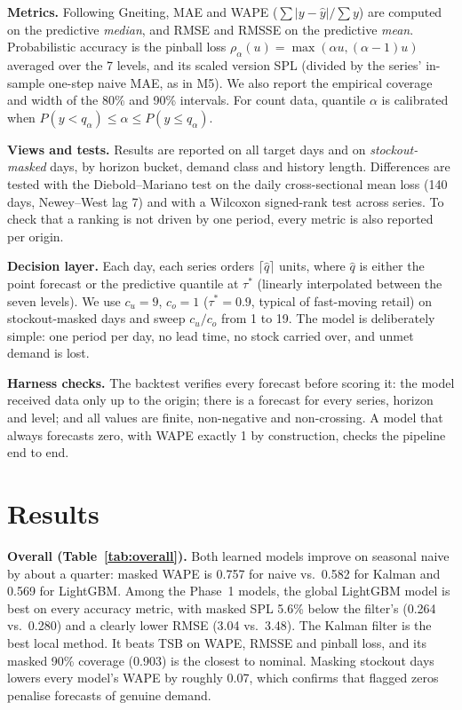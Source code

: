 \documentclass[conference]{IEEEtran}
\begin{document}
\textbf{Metrics.} Following Gneiting, MAE and WAPE ($\sum|y-\hat y|/\sum y$) are computed on the predictive \emph{median}, and RMSE and RMSSE on the predictive \emph{mean}. Probabilistic accuracy is the pinball loss $\rho_\alpha(u)=\max(\alpha u,(\alpha-1)u)$ averaged over the 7 levels, and its scaled version SPL (divided by the series' in-sample one-step naive MAE, as in M5). We also report the empirical coverage and width of the 80\% and 90\% intervals. For count data, quantile $\alpha$ is calibrated when $P(y<q_\alpha)\le\alpha\le P(y\le q_\alpha)$.

\textbf{Views and tests.} Results are reported on all target days and on \emph{stockout-masked} days, by horizon bucket, demand class and history length. Differences are tested with the Diebold--Mariano test on the daily cross-sectional mean loss (140 days, Newey--West lag 7) and with a Wilcoxon signed-rank test across series. To check that a ranking is not driven by one period, every metric is also reported per origin.

\textbf{Decision layer.} Each day, each series orders $\lceil\hat q\rceil$ units, where $\hat q$ is either the point forecast or the predictive quantile at $\tau^\ast$ (linearly interpolated between the seven levels). We use $c_u=9$, $c_o=1$ ($\tau^\ast=0.9$, typical of fast-moving retail) on stockout-masked days and sweep $c_u/c_o$ from 1 to 19. The model is deliberately simple: one period per day, no lead time, no stock carried over, and unmet demand is lost.

\textbf{Harness checks.} The backtest verifies every forecast before scoring it: the model received data only up to the origin; there is a forecast for every series, horizon and level; and all values are finite, non-negative and non-crossing. A model that always forecasts zero, with WAPE exactly 1 by construction, checks the pipeline end to end.

\section{Results}
\label{sec:results}
\textbf{Overall (Table~\ref{tab:overall}).} Both learned models improve on seasonal naive by about a quarter: masked WAPE is 0.757 for naive vs.\ 0.582 for Kalman and 0.569 for LightGBM. Among the Phase~1 models, the global LightGBM model is best on every accuracy metric, with masked SPL 5.6\% below the filter's (0.264 vs.\ 0.280) and a clearly lower RMSE (3.04 vs.\ 3.48). The Kalman filter is the best local method. It beats TSB on WAPE, RMSSE and pinball loss, and its masked 90\% coverage (0.903) is the closest to nominal. Masking stockout days lowers every model's WAPE by roughly 0.07, which confirms that flagged zeros penalise forecasts of genuine demand.
\end{document}
